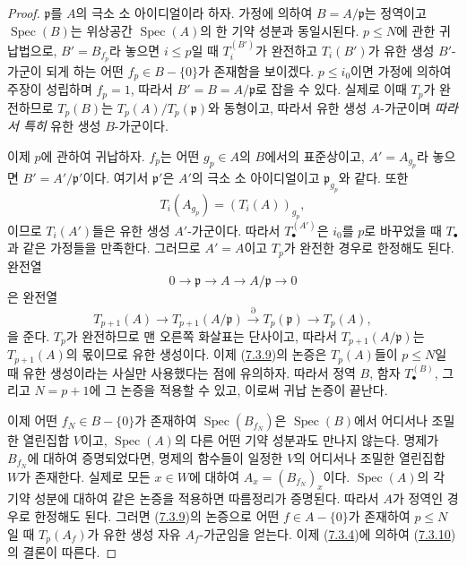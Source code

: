 \begin{proof}
$\mathfrak p$를 $A$의 극소 소 아이디얼이라 하자. 가정에 의하여
$B=A/\mathfrak p$는 정역이고 $\operatorname{Spec}(B)$는 위상공간
$\operatorname{Spec}(A)$의 한 기약 성분과 동일시된다. $p\leq N$에
관한 귀납법으로, $B'=B_{f_p}$라 놓으면 $i\leq p$일 때
$T_i^{(B')}$가 완전하고 $T_i(B')$가 유한 생성 $B'$-가군이 되게 하는
어떤 $f_p\in B-\{0\}$가 존재함을 보이겠다. $p\leq i_0$이면 가정에
의하여 주장이 성립하며 $f_p=1$, 따라서 $B'=B=A/\mathfrak p$로 잡을
수 있다. 실제로 이때 $T_p$가 완전하므로 $T_p(B)$는
$T_p(A)/T_p(\mathfrak p)$와 동형이고, 따라서 유한 생성 $A$-가군이며
\emph{따라서 특히} 유한 생성 $B$-가군이다.

이제 $p$에 관하여 귀납하자. $f_p$는 어떤 $g_p\in A$의 $B$에서의
표준상이고, $A'=A_{g_p}$라 놓으면
$B'=A'/\mathfrak p'$이다. 여기서 $\mathfrak p'$은 $A'$의 극소 소
아이디얼이고 $\mathfrak p_{g_p}$와 같다. 또한
\[
  T_i(A_{g_p})=(T_i(A))_{g_p},
\]
이므로 $T_i(A')$들은 유한 생성 $A'$-가군이다. 따라서
$T_\bullet^{(A')}$은 $i_0$를 $p$로 바꾸었을 때 $T_\bullet$과 같은
가정들을 만족한다. 그러므로 $A'=A$이고 $T_p$가 완전한 경우로
한정해도 된다. 완전열
\[
  0\longrightarrow\mathfrak p\longrightarrow A\longrightarrow A/\mathfrak p
  \longrightarrow0
\]
은 완전열
\[
  T_{p+1}(A)\longrightarrow T_{p+1}(A/\mathfrak p)
  \xrightarrow{\partial}T_p(\mathfrak p)\longrightarrow T_p(A),
\]
을 준다. $T_p$가 완전하므로 맨 오른쪽 화살표는 단사이고, 따라서
$T_{p+1}(A/\mathfrak p)$는 $T_{p+1}(A)$의 몫이므로 유한 생성이다.
이제 (\hyperref[III.7.3.9-fr]{7.3.9})의 논증은 $T_p(A)$들이
$p\leq N$일 때 유한 생성이라는 사실만 사용했다는 점에 유의하자.
따라서 정역 $B$, 함자 $T_\bullet^{(B)}$, 그리고 $N=p+1$에 그 논증을
적용할 수 있고, 이로써 귀납 논증이 끝난다.

이제 어떤 $f_N\in B-\{0\}$가 존재하여
$\operatorname{Spec}(B_{f_N})$은 $\operatorname{Spec}(B)$에서
어디서나 조밀한 열린집합 $V$이고, $\operatorname{Spec}(A)$의 다른
어떤 기약 성분과도 만나지 않는다. 명제가 $B_{f_N}$에 대하여
증명되었다면, 명제의 함수들이 일정한 $V$의 어디서나 조밀한
열린집합 $W$가 존재한다. 실제로 모든 $x\in W$에 대하여
$A_x=(B_{f_N})_x$이다. $\operatorname{Spec}(A)$의 각 기약 성분에
대하여 같은 논증을 적용하면 따름정리가 증명된다. 따라서 $A$가
정역인 경우로 한정해도 된다. 그러면
(\hyperref[III.7.3.9-fr]{7.3.9})의 논증으로 어떤
$f\in A-\{0\}$가 존재하여 $p\leq N$일 때 $T_p(A_f)$가 유한 생성
자유 $A_f$-가군임을 얻는다. 이제
(\hyperref[III.7.3.4-fr]{7.3.4})에 의하여
(\hyperref[III.7.3.10-fr]{7.3.10})의 결론이 따른다.
\end{proof}

